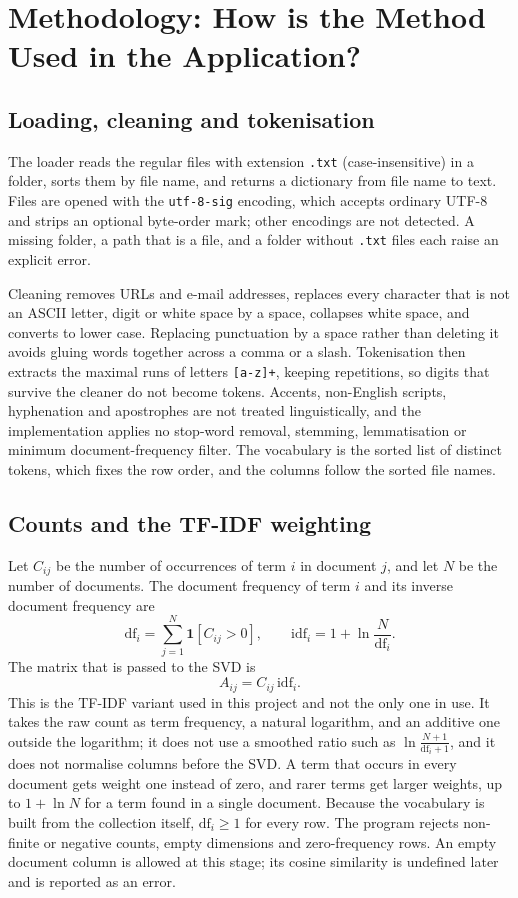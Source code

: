 \documentclass[12pt,a4paper]{report}
\theoremstyle{plain}
\theoremstyle{definition}
\theoremstyle{remark}
\theoremstyle{definition}
\begin{document}
\section{Methodology: How is the Method Used in the Application?}

\subsection{Loading, cleaning and tokenisation}

The loader reads the regular files with extension \texttt{.txt} (case-insensitive) in a folder, sorts them by file name, and returns a dictionary from file name to text. Files are opened with the \texttt{utf-8-sig} encoding, which accepts ordinary UTF-8 and strips an optional byte-order mark; other encodings are not detected. A missing folder, a path that is a file, and a folder without \texttt{.txt} files each raise an explicit error.

Cleaning removes URLs and e-mail addresses, replaces every character that is not an ASCII letter, digit or white space by a space, collapses white space, and converts to lower case. Replacing punctuation by a space rather than deleting it avoids gluing words together across a comma or a slash. Tokenisation then extracts the maximal runs of letters \texttt{[a-z]+}, keeping repetitions, so digits that survive the cleaner do not become tokens. Accents, non-English scripts, hyphenation and apostrophes are not treated linguistically, and the implementation applies no stop-word removal, stemming, lemmatisation or minimum document-frequency filter. The vocabulary is the sorted list of distinct tokens, which fixes the row order, and the columns follow the sorted file names.

\subsection{Counts and the TF-IDF weighting}

Let $C_{ij}$ be the number of occurrences of term $i$ in document $j$, and let $N$ be the number of documents. The document frequency of term $i$ and its inverse document frequency are
\[
\mathrm{df}_i=\sum_{j=1}^N\mathbf 1[C_{ij}>0],\qquad \mathrm{idf}_i=1+\ln\frac{N}{\mathrm{df}_i}.
\]
The matrix that is passed to the SVD is
\begin{equation}\label{eq:tfidf}
A_{ij}=C_{ij}\,\mathrm{idf}_i .
\end{equation}
This is the TF-IDF variant used in this project and not the only one in use. It takes the raw count as term frequency, a natural logarithm, and an additive one outside the logarithm; it does not use a smoothed ratio such as $\ln\frac{N+1}{\mathrm{df}_i+1}$, and it does not normalise columns before the SVD. A term that occurs in every document gets weight one instead of zero, and rarer terms get larger weights, up to $1+\ln N$ for a term found in a single document. Because the vocabulary is built from the collection itself, $\mathrm{df}_i\ge1$ for every row. The program rejects non-finite or negative counts, empty dimensions and zero-frequency rows. An empty document column is allowed at this stage; its cosine similarity is undefined later and is reported as an error.
\end{document}
